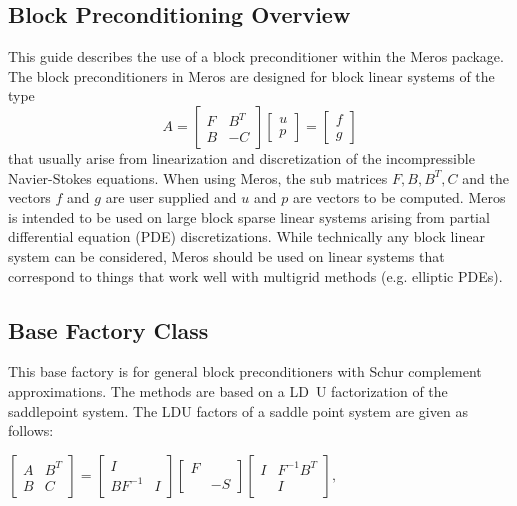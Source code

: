 \documentclass[oneeqnum,onefignum,onetabnum,10pt]{SANDreport}
\begin{document}
\subsection{Block Preconditioning Overview}
This guide describes the use of a block preconditioner within the
Meros package.  The block preconditioners in Meros are designed for
block linear systems of the type
$$ A = 
\begin{bmatrix}
F & B^T \\
B & -C
\end{bmatrix}
\begin{bmatrix}
u \\
p
\end{bmatrix}
=
\begin{bmatrix}
f \\
g
\end{bmatrix}
$$
that usually arise from linearization and discretization of the
incompressible Navier-Stokes equations. When using Meros, the sub
matrices $F, B, B^T, C$ and the vectors $f$ and $g$ are user supplied
and $u$ and $p$ are vectors to be computed.  Meros is intended to be
used on large block sparse linear systems arising from partial
differential equation (PDE) discretizations.  While technically any
block linear system can be considered, Meros should be used on linear
systems that correspond to things that work well with multigrid
methods (e.g. elliptic PDEs).


\subsection{Base Factory Class}
This base factory is for general block preconditioners with Schur
complement approximations. The methods are based on a LD\ U
factorization of the saddlepoint system. The LDU factors of a saddle
point system are given as follows:

$ \begin{bmatrix} A & B^T \\ B & C \end{bmatrix} = \begin{bmatrix} I &
 \\ BF^{-1} & I \end{bmatrix} \begin{bmatrix} F & \\\ & -S
 \end{bmatrix} \begin{bmatrix} I & F^{-1} B^T \\ & I \end{bmatrix}, $
\end{document}
